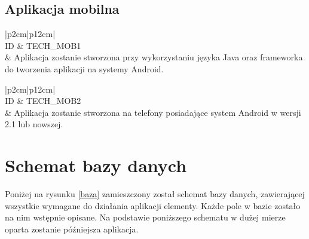 \documentclass[a4paper]{article}
\begin{document}
\subsection{Aplikacja mobilna}

\begin{table}[h!] 
\centering
\caption{Wymaganie techniczne aplikacji internetowej TECH\_MOB1}
\begin{tabular}{|p{2cm}|p{12cm}|} \hline	
	\\ 
	\hline ID & TECH\_MOB1 \\ 
	\hline \hline
	  & Aplikacja zostanie stworzona przy wykorzystaniu języka
	 Java oraz frameworka do tworzenia aplikacji na systemy Android. \\
	 \hline
	
\end{tabular}
\label{tech_mob1}
\end{table}


\begin{table}[h!] 
\centering
\caption{Wymaganie techniczne aplikacji internetowej TECH\_MOB2}
\begin{tabular}{|p{2cm}|p{12cm}|} \hline 	
	\\ 
	\hline ID & TECH\_MOB2 \\ 
	\hline \hline
	  & Aplikacja zostanie stworzona na telefony posiadające system Android w wersji 2.1 lub nowszej. \\
	 \hline
	
\end{tabular}
\label{tech_mob2}
\end{table}

\newpage

\section{Schemat bazy danych}
Poniżej na rysunku \ref{baza} zamieszczony został schemat bazy danych, zawierającej wszystkie wymagane do działania aplikacji
elementy.
Każde pole w bazie zostało na nim wstępnie opisane.
Na podstawie poniższego schematu w dużej mierze oparta zostanie późniejsza aplikacja.
\end{document}
